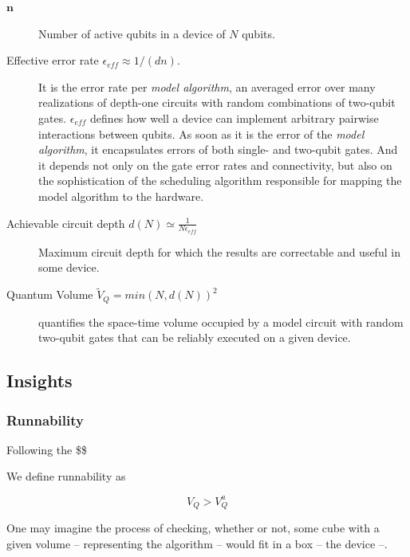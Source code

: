 \documentclass[11pt]{article}
\begin{document}
\begin{description}
\item[{\(\textbf{n}\)}] Number of active qubits in a device of \(N\) qubits.
\end{description}


\begin{description}
\item[{Effective error rate \(\epsilon_{eff} \approx 1/(d n)\).}] It is the error rate per \emph{model algorithm}, an averaged error over many realizations of depth-one circuits with random combinations of two-qubit gates. \(\epsilon_{eff}\) defines how well a device can implement arbitrary pairwise interactions between qubits. As soon as it is the error of the \emph{model algorithm}, it encapsulates errors of both single- and two-qubit gates. And it depends not only on the gate error rates and connectivity, but also on the sophistication of the scheduling algorithm responsible for mapping the model algorithm to the hardware.

\item[{Achievable circuit depth \(d(N) \simeq \frac{1}{N \epsilon_{eff}}\)}] Maximum circuit depth for which the results are correctable and useful in some device.
\end{description}

\begin{description}
\item[{Quantum Volume \(\tilde{V}_Q = min (N, d(N))^2\)}] quantifies the space-time volume occupied by a model circuit with random two-qubit gates that can be reliably executed on a given device.
\end{description}

\subsection{Insights}
\label{sec:org536b46a}

\subsubsection{Runnability}
\label{sec:org1a41336}

Following the \$\$

We define runnability as 

$$V_Q > V_Q^a$$

One may imagine the process of checking, whether or not, some cube with a given volume -- representing the algorithm -- would fit in a box -- the device --.
\end{document}
